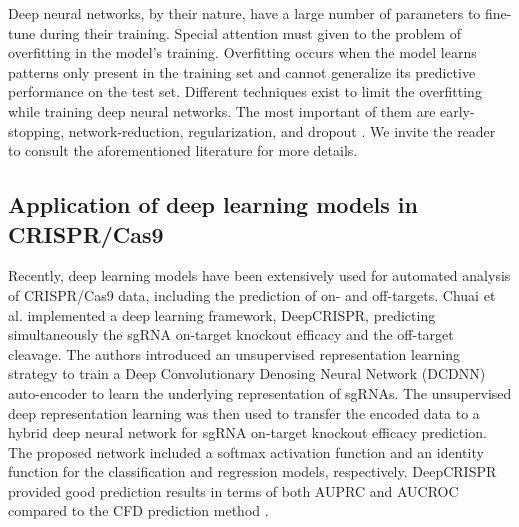 \documentclass[unnumsec,webpdf,contemporary,large]{oup-authoring-template}
\theoremstyle{thmstyleone}%
\theoremstyle{thmstyletwo}%
\theoremstyle{thmstylethree}%
\begin{document}
Deep neural networks, by their nature, have a large number of parameters to fine-tune during their training. Special attention must given to the problem of overfitting in the model's training. Overfitting occurs when the model learns patterns only present in the training set and cannot generalize its predictive performance on the test set. Different techniques exist to limit the overfitting while training deep neural networks. The most important of them are early-stopping, network-reduction, regularization, and dropout \cite{heaton2018ian,ying2019overview}. We invite the reader to consult the aforementioned literature for more details.

\subsection{\textbf{Application of deep learning models in CRISPR/Cas9}}
Recently, deep learning models have been extensively used for automated analysis of CRISPR/Cas9 data, including the prediction of on- and off-targets. Chuai et al. \cite{chuai2018deepcrispr} implemented a deep learning framework, DeepCRISPR, predicting simultaneously the sgRNA on-target knockout efficacy and the off-target cleavage. The authors introduced an unsupervised representation learning strategy to train a Deep Convolutionary Denosing Neural Network (DCDNN) auto-encoder to learn the underlying representation of sgRNAs. The unsupervised deep representation learning was then used to transfer the encoded data to a hybrid deep neural network for sgRNA on-target knockout efficacy prediction. The proposed network included a softmax activation function and an identity function for the classification and regression models, respectively. DeepCRISPR provided good prediction results in terms of both AUPRC and AUCROC compared to the CFD prediction method \cite{doench2014rational}. 
\end{document}
